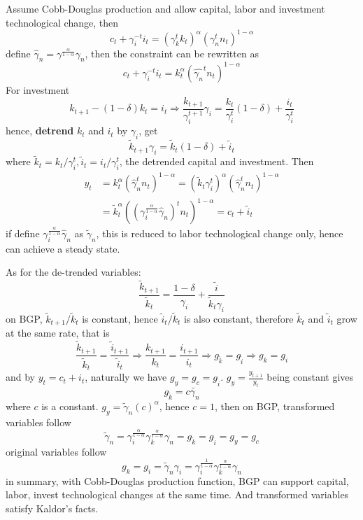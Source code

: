\documentclass[10pt,landscape,a4paper]{article}
\begin{document}
\begin{multicols*}{3}
Assume Cobb-Douglas production and allow capital, labor and investment technological change, then
$$
c_t+\gamma_i^{-t}i_t = \left(\gamma_k^tk_t\right)^{\alpha}\left(\gamma_n^t n_t\right)^{1-\alpha}
$$
define $\hat{\gamma}_n=\gamma^{\frac{\alpha}{1-\alpha}}\gamma_n$, then the constraint can be rewritten as
$$
c_t+\gamma_i^{-t}i_t = k_t^{\alpha}\left(\hat{\gamma_n}^t n_t\right)^{1-\alpha}
$$
For investment
$$
k_{t+1}-(1-\delta)k_t=i_t\Rightarrow \frac{k_{t+1}}{\gamma_i^{t+1}}\gamma_i = \frac{k_t}{\gamma_i^t}(1-\delta)+\frac{i_t}{\gamma_i^t}
$$
hence, \textbf{detrend} $k_t$ and $i_t$ by $\gamma_i$, get
$$
\tilde{k}_{t+1}\gamma_i =\tilde{k}_t(1-\delta)+\tilde{i}_t
$$
where $\tilde{k}_t=k_t/\gamma_i^t, \tilde{i}_t=i_t/\gamma_i^t$, the detrended capital and investment. Then
\begin{align*}
    y_t & = k_t^{\alpha}\left(\hat{\gamma}_n^t n_t\right)^{1-\alpha} = (\tilde{k}_t\gamma_i^t)^{\alpha}\left(\hat{\gamma}_n^t n_t\right)^{1-\alpha}\\
    &= \tilde{k}_t^{\alpha}\left(\left(\gamma_i^{\frac{\alpha}{1-\alpha}}\hat{\gamma}_n\right)^tn_t\right)^{1-\alpha} = c_t+\tilde{i}_t
\end{align*}
if define $\gamma_i^{\frac{\alpha}{1-\alpha}}\hat{\gamma}_n$ as $\tilde{\gamma}_n$, this is reduced to labor technological change only, hence can achieve a steady state. 

As for the de-trended variables:
$$
\frac{\tilde{k}_{t+1}}{\tilde{k}_t}=\frac{1-\delta}{\gamma_i}+\frac{\tilde{i}}{\tilde{k}_t\gamma_i}
$$
on BGP, $\tilde{k}_{t+1}/\tilde{k}_t$ is constant, hence $\tilde{i}_t/\tilde{k}_t$ is also constant, therefore $\tilde{k}_t$ and $\tilde{i}_t$ grow at the same rate, that is
$$
\frac{\tilde{k}_{t+1}}{\tilde{k}_t}=\frac{\tilde{i}_{t+1}}{\tilde{i}_t}\Rightarrow \frac{k_{t+1}}{k_t}=\frac{i_{t+1}}{i_t}\Rightarrow g_{\tilde{k}}=g_{\tilde{i}}\Rightarrow g_k=g_i
$$
and by $y_t=c_t+i_t$, naturally we have $g_y=g_c=g_{\tilde{i}}$. $g_y=\frac{y_{t+1}}{y_t}$ being constant gives
$$
g_{\tilde{k}}= c\tilde{\gamma_n}
$$
where $c$ is a constant. $g_y = \tilde{\gamma}_n(c)^\alpha$, hence $c=1$, then on BGP, transformed variables follow
$$
\tilde{\gamma}_n=\gamma_i^{\frac{\alpha}{1-\alpha}}\gamma_k^{\frac{\alpha}{1-\alpha}}\gamma_n = g_{\tilde{k}}=g_{\tilde{i}}=g_y=g_c
$$
original variables follow
$$
g_k=g_i=\tilde{\gamma}_n\gamma_i =\gamma_i^{\frac{1}{1-\alpha}}\gamma_k^{\frac{\alpha}{1-\alpha}}\gamma_n
$$
in summary, with Cobb-Douglas production function, BGP can support capital, labor, invest technological changes at the same time. And transformed variables satisfy Kaldor's facts.


\end{multicols*}
\end{document}
